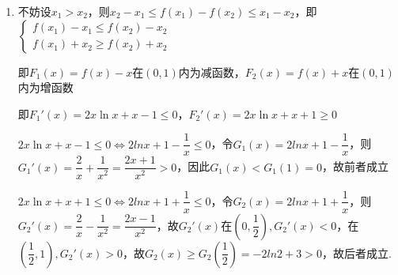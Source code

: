 \begin{enumerate}
\begin{enumerate}
\begin{jieda}
\begin{enumerate}
                $t\left( x\right)$ 在$(0, 1)$单调递减，在$\left( {1, + \infty }\right)$ 单调递增，所以 $t{\left( x\right) }_{\min } = t\left( 1\right)  = 0$，得证.

                \item 不妨设$x_1 > x_2$，则$x_2-x_1 \leq f(x_1) - f(x_2) \leq x_1-x_2$，即$\left\{\begin{array}{l}
                     f(x_1)-x_1 \leq f(x_2)-x_2 \\
                     f(x_1)+x_2 \geq f(x_2)+x_2
                \end{array}\right.$

                即$F_1(x) = f(x)-x$在$(0, 1)$内为减函数，$F_2(x) = f(x)+x$在$(0, 1)$内为增函数

                即$F_1'(x) = {2x}\ln x + x-1 \leq 0$，$F_2'(x) = {2x}\ln x + x+1 \geq 0$

                ${2x}\ln x + x-1 \leq 0 \Longleftrightarrow 2lnx+1-\dfrac{1}{x} \leq 0$，令$G_1(x) = 2lnx+1-\dfrac{1}{x}$，则$G_1'(x) = \dfrac{2}{x}+\dfrac{1}{x^2} = \dfrac{2x+1}{x^2} > 0$，因此$G_1(x) < G_1(1) = 0$，故前者成立

                ${2x}\ln x + x+1 \leq 0 \Longleftrightarrow 2lnx+1+\dfrac{1}{x} \leq 0$，令$G_2(x) = 2lnx+1+\dfrac{1}{x}$，则$G_2'(x) = \dfrac{2}{x}-\dfrac{1}{x^2} = \dfrac{2x-1}{x^2}$，故$G_2'(x)$在$\left(0, \dfrac{1}{2}\right),G_2'(x) < 0$，在$\left(\dfrac{1}{2}, 1\right), G_2'(x) > 0$，故$G_2(x) \geq G_2\left(\dfrac{1}{2}\right) = -2ln2+3 > 0$，故后者成立.
            \end{enumerate}
        \end{jieda}
    \end{enumerate}
    

\end{enumerate}
